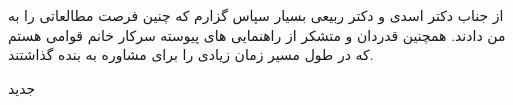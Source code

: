 


\begin{center}
\end{center}

از جناب دکتر اسدی و دکتر ربیعی بسیار سپاس گزارم که چنین فرصت مطالعاتی را به من دادند.
همچنین قدردان و متشکر از راهنمایی های پیوسته سرکار خانم قوامی هستم که در طول مسیر زمان زیادی را برای مشاوره به بنده گذاشتند.

‌جدید
